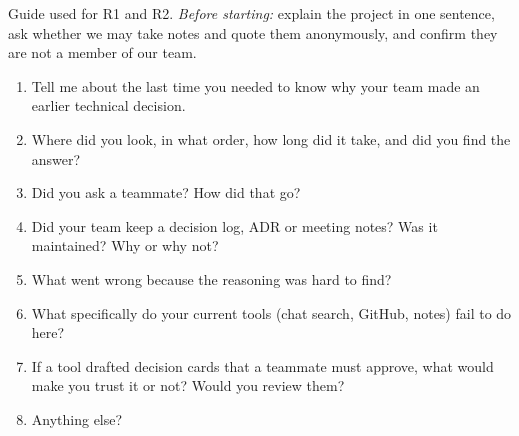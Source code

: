 \documentclass[11pt,a4paper]{article}
\begin{document}
Guide used for R1 and R2. \emph{Before starting:} explain the project in one sentence, ask whether we may take notes and quote them anonymously, and confirm they are not a member of our team.

\begin{enumerate}
  \item Tell me about the last time you needed to know why your team made an earlier technical decision.
  \item Where did you look, in what order, how long did it take, and did you find the answer?
  \item Did you ask a teammate? How did that go?
  \item Did your team keep a decision log, ADR or meeting notes? Was it maintained? Why or why not?
  \item What went wrong because the reasoning was hard to find?
  \item What specifically do your current tools (chat search, GitHub, notes) fail to do here?
  \item If a tool drafted decision cards that a teammate must approve, what would make you trust it or not? Would you review them?
  \item Anything else?
\end{enumerate}
\end{document}
